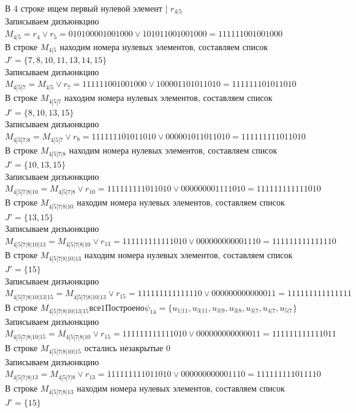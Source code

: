 \documentclass[12pt,a4paper]{report}
\begin{document}
В 4 строке ищем первый нулевой элемент | $r_{4 | 5}$ \\
Записываем дизъюнкцию $M_{4 | 5} = r_{4}\vee r_{5} = 010100001001000 \vee 101011001001000 = 111111001001000$ \\
В строке $M_{4 | 5}$ находим номера нулевых элементов, составляем список $J' = \{7, 8, 10, 11, 13, 14, 15\}$ \\
Записываем дизъюнкцию $M_{4 | 5 | 7} = M_{4 | 5}\vee r_{7} = 111111001001000 \vee 100001101011010 = 111111101011010$ \\
В строке $M_{4 | 5 | 7}$ находим номера нулевых элементов, составляем список $J' = \{8, 10, 13, 15\}$ \\
Записываем дизъюнкцию $M_{4 | 5 | 7 | 8} = M_{4 | 5 | 7}\vee r_{8} = 111111101011010 \vee 000001011011010 = 111111111011010$ \\
В строке $M_{4 | 5 | 7 | 8}$ находим номера нулевых элементов, составляем список $J' = \{10, 13, 15\}$ \\
Записываем дизъюнкцию $M_{4 | 5 | 7 | 8 | 10} = M_{4 | 5 | 7 | 8}\vee r_{10} = 111111111011010 \vee 000000001111010 = 111111111111010$ \\
В строке $M_{4 | 5 | 7 | 8 | 10}$ находим номера нулевых элементов, составляем список $J' = \{13, 15\}$ \\
Записываем дизъюнкцию $M_{4 | 5 | 7 | 8 | 10 | 13} = M_{4 | 5 | 7 | 8 | 10}\vee r_{13} = 111111111111010 \vee 000000000001110 = 111111111111110$ \\
В строке $M_{4 | 5 | 7 | 8 | 10 | 13}$ находим номера нулевых элементов, составляем список $J' = \{15\}$ \\
Записываем дизъюнкцию $M_{4 | 5 | 7 | 8 | 10 | 13 | 15} = M_{4 | 5 | 7 | 8 | 10 | 13}\vee r_{15} = 111111111111110 \vee 000000000000011 = 111111111111111$ \\
В строке $M_{4 | 5 | 7 | 8 | 10 | 13 | 15} все 1 Построено \psi_{14} = \{u_{1 | 11},u_{3 | 11},u_{3 | 9},u_{3 | 8},u_{3 | 7},u_{4 | 7},u_{5 | 7}\}$ \\
Записываем дизъюнкцию $M_{4 | 5 | 7 | 8 | 10 | 15} = M_{4 | 5 | 7 | 8 | 10}\vee r_{15} = 111111111111010 \vee 000000000000011 = 111111111111011$ \\
В строке $M_{4 | 5 | 7 | 8 | 10 | 15}$ остались незакрытые $0$ \\
Записываем дизъюнкцию $M_{4 | 5 | 7 | 8 | 13} = M_{4 | 5 | 7 | 8}\vee r_{13} = 111111111011010 \vee 000000000001110 = 111111111011110$ \\
В строке $M_{4 | 5 | 7 | 8 | 13}$ находим номера нулевых элементов, составляем список $J' = \{15\}$ \\
\end{document}
